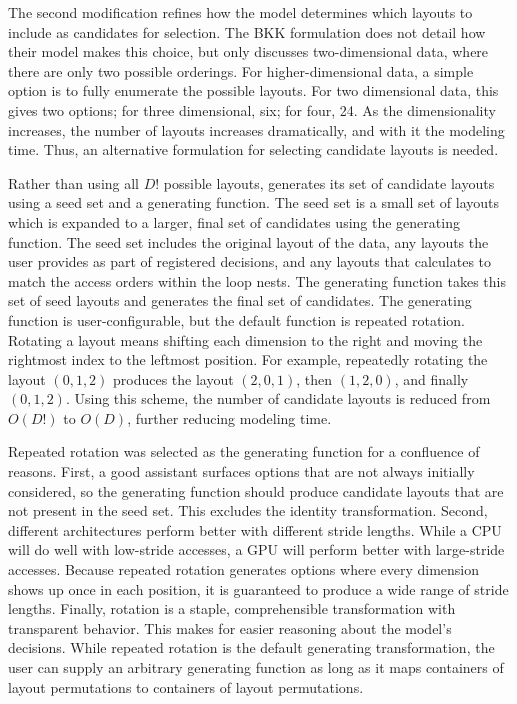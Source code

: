 The second modification refines how the model determines which layouts to include as candidates for selection.
The BKK formulation does not detail how their model makes this choice, but only discusses two-dimensional data, where there are only two possible orderings.
For higher-dimensional data, a simple option is to fully enumerate the possible layouts.
For two dimensional data, this gives two options; for three dimensional, six; for four, 24.
As the dimensionality increases, the number of layouts increases dramatically, and with it the modeling time.
Thus, an alternative formulation for selecting candidate layouts is needed.

Rather than using all $D!$ possible layouts, \FormatDecisions{} generates its set of candidate layouts using a seed set and a generating function.
The seed set is a small set of layouts which is expanded to a larger, final set of candidates using the generating function.
The seed set includes the original layout of the data, any layouts the user provides as part of registered decisions, and any layouts that \FormatDecisions{} calculates to match the access orders within the loop nests.
The generating function takes this set of seed layouts and generates the final set of candidates.
The generating function is user-configurable, but the default function is repeated rotation.
Rotating a layout means shifting each dimension to the right and moving the rightmost index to the leftmost position.
For example, repeatedly rotating the layout $(0,1,2)$ produces the layout $(2,0,1)$, then $(1,2,0)$, and finally $(0,1,2)$. 
Using this scheme, the number of candidate layouts is reduced from $O(D!)$ to $O(D)$, further reducing modeling time.

Repeated rotation was selected as the generating function for a confluence of reasons.
First, a good assistant surfaces options that are not always initially considered, so the generating function should produce candidate layouts that are not present in the seed set.
This excludes the identity transformation.
Second, different architectures perform better with different stride lengths.
While a CPU will do well with low-stride accesses, a GPU will perform better with large-stride accesses.
Because repeated rotation generates options where every dimension shows up once in each position, it is guaranteed to produce a wide range of stride lengths.
Finally, rotation is a staple, comprehensible transformation with transparent behavior.
This makes for easier reasoning about the model's decisions.
While repeated rotation is the default generating transformation, the user can supply an arbitrary generating function as long as it maps containers of layout permutations to containers of layout permutations.

